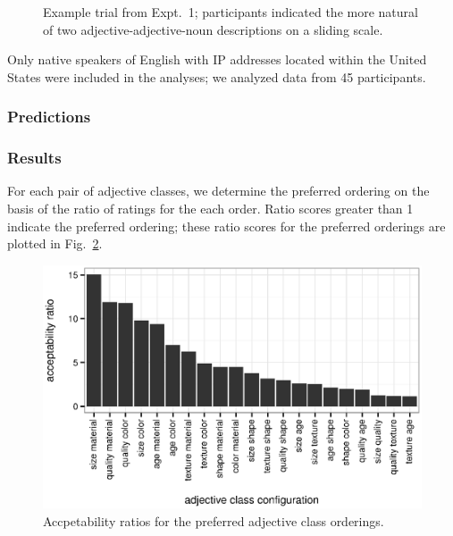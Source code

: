\documentclass[11pt]{article}
\begin{document}
\begin{figure}[h!]
	\centering
	\caption{Example trial from Expt.~1; participants indicated the more natural of two adjective-adjective-noun descriptions on a sliding scale.}\label{order-trial}
\end{figure}

Only native speakers of English with IP addresses located within the United States were included in the analyses; we analyzed data from 45 participants.

\subsubsection{Predictions}



\subsubsection{Results}

For each pair of adjective classes, we determine the preferred ordering on the basis of the ratio of ratings for the each order. Ratio scores greater than 1 indicate the preferred ordering; these ratio scores for the preferred orderings are plotted in Fig.~\ref{order-ratio}.

\begin{figure}[h!]
	\centering
	\includegraphics[width=.8\linewidth]{plots/order_ratio.eps}
\caption{Accpetability ratios for the preferred adjective class orderings.}\label{order-ratio}
\end{figure}
\end{document}
